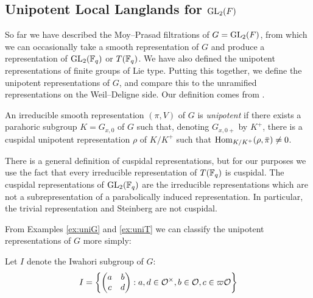 \subsection{Unipotent Local Langlands for \texorpdfstring{$\mathrm{GL}_2(F)$}{TEXT}}

So far we have described the Moy--Prasad filtrations of $G=\mathrm{GL}_2(F)$, from which we can occasionally take a smooth representation of $G$ and produce a representation of $\mathrm{GL}_2(\mathbb{F}_q)$ or $T(\mathbb{F}_q)$. We have also defined the unipotent representations of finite groups of Lie type. Putting this together, we define the unipotent representations of $G$, and compare this to the unramified representations on the Weil--Deligne side. Our definition comes from \cite{Lus1}.

\begin{defn}
    An irreducible smooth representation $(\pi,V)$ of $G$ is \textit{unipotent} if there exists a parahoric subgroup $K=G_{x,0}$ of $G$ such that, denoting $G_{x,0+}$ by $K^+$, there is a cuspidal unipotent representation $\rho$ of $K/K^+$ such that $\mathrm{Hom}_{K/K^+}(\rho, \bar{\pi}) \neq 0$.
\end{defn}
\begin{rem}
    There is a general definition of cuspidal representations, but for our purposes we use the fact that every irreducible representation of $T(\mathbb{F}_q)$ is cuspidal. The cuspidal representations of $\mathrm{GL}_2(\mathbb{F}_q)$ are the irreducible representations which are not a subrepresentation of a parabolically induced representation. In particular, the trivial representation and Steinberg are not cuspidal.
\end{rem}

From Examples \ref{ex:uniG} and \ref{ex:uniT} we can classify the unipotent representations of $G$ more simply:

\begin{notn}
    Let $I$ denote the Iwahori subgroup of $G$:
    $$I = \left\{ \begin{pmatrix}
        a&b\\c&d
    \end{pmatrix} : a,d \in \mathcal{O}^\times, b \in \mathcal{O}, c \in \varpi\mathcal{O}\right\}$$ 
\end{notn}

